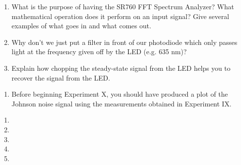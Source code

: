 \documentclass{../signatures}
\begin{document}
\maketitle

\names

\prelab

\begin{enumerate}

    \item What is the purpose of having the SR760 FFT Spectrum Analyzer? What mathematical operation does it perform on an input signal? Give several examples of what goes in and what comes out.
    
    \item Why don’t we just put a filter in front of our photodiode which only passes light at the frequency given off by the LED (e.g. 635 nm)?

    \item Explain how chopping the steady-state signal from the LED helps you to recover the signal from the LED.
       \\[36pt]
\end{enumerate}

\prelabsignatures

\midlab

\begin{enumerate}

    \item Before beginning Experiment X, you should have produced a plot of the Johnson noise signal using the measurements obtained in Experiment IX.
\\[36pt]
\end{enumerate}

\midlabsignaturesLLS

\checkpointsection 

\begin{enumerate}

\item {}

\item {}

\item {}

\item {}

\item {}

\end{enumerate}
\end{document}
